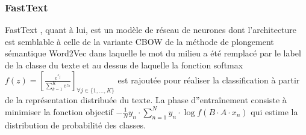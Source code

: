 \subsubsection{FastText}
  
 FastText \citep{grave2017fasttextcls}, quant à lui, est un modèle de réseau de neurones dont l'architecture est semblable à celle de la variante CBOW de la méthode de plongement sémantique Word2Vec dans laquelle le mot du milieu a été remplacé par le label de la classe du texte et au dessus de laquelle la fonction softmax $f(z) = \left[ \frac{e^{z_j}}{\sum\limits_{k=1}^K e^{z_k}} \right]_{\forall j \in \lbrace 1, ..., K \rbrace} $ est rajoutée pour réaliser la classification à partir de la représentation distribuée du texte. La phase d''entraînement consiste à minimiser la fonction objectif $-\frac{1}{N}y_n \cdot \sum\limits_{n=1}^N y_n \cdot \log{f(B\cdot A\cdot x_n)}$ qui estime la distribution de probabilité des classes.


